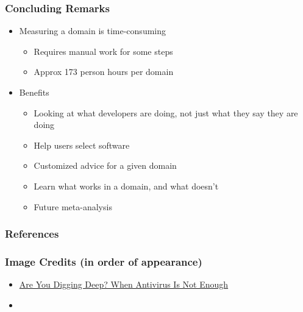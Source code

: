\documentclass[usenames,dvipsnames]{beamer}
\begin{document}
\begin{frame}
  
  \frametitle{Concluding Remarks}
  
  \begin{itemize}
    \item Measuring a domain is time-consuming
    \begin{itemize}
      \item Requires manual work for some steps
      \item Approx 173 person hours per domain
    \end{itemize}
    \item Benefits
    \begin{itemize}
      \item Looking at what developers are doing, not just what they say they
      are doing
      \item Help users select software      
      \item Customized advice for a given domain
      \item Learn what works in a domain, and what doesn't
      \item Future meta-analysis
    \end{itemize}
  \end{itemize}
  
\end{frame}
    
  
\begin{frame}[allowframebreaks]
\frametitle{References}


\end{frame}


\begin{frame}
\frametitle{Image Credits (in order of appearance)}

\begin{itemize}
\item
\href{https://securityintelligence.com/are-you-digging-deep-when-antivirus-is-not-enough/} 
{Are You Digging Deep? When Antivirus Is Not Enough}
\item \citet{SadeghiEtAl2022b}
\end{itemize}

\end{frame}
  
\end{document}
